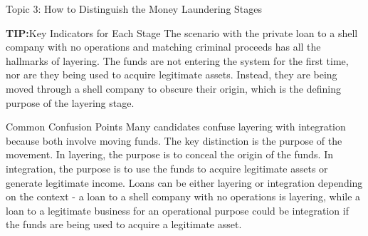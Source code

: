 \documentclass[8pt]{beamer}  %
\newcommand{\tip}{\textcolor{infoblue}{\textbf{TIP:}}}
\begin{document}
\begin{frame}{Topic 3: How to Distinguish the Money Laundering Stages}
\begin{block}{\large \tip Key Indicators for Each Stage}
			The scenario with the private loan to a shell company with no operations and matching criminal proceeds has all the hallmarks of layering. The funds are not entering the system for the first time, nor are they being used to acquire legitimate assets. Instead, they are being moved through a shell company to obscure their origin, which is the defining purpose of the layering stage.
		\end{block}
		
		\vspace{0.2cm}
		\begin{block}{\large Common Confusion Points}
			Many candidates confuse layering with integration because both involve moving funds. The key distinction is the purpose of the movement. In layering, the purpose is to conceal the origin of the funds. In integration, the purpose is to use the funds to acquire legitimate assets or generate legitimate income. Loans can be either layering or integration depending on the context - a loan to a shell company with no operations is layering, while a loan to a legitimate business for an operational purpose could be integration if the funds are being used to acquire a legitimate asset.
		\end{block}
	\end{frame}
	
\end{document}
